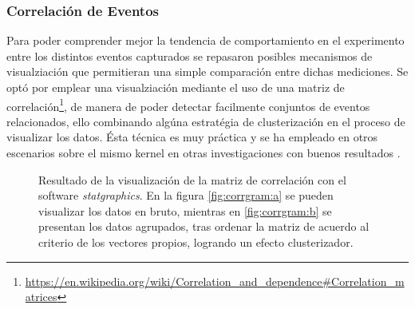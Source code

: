 \subsubsection{Correlación de Eventos}
Para poder comprender mejor la tendencia de comportamiento en el experimento entre los distintos eventos capturados se repasaron posibles mecanismos de visualziación que permitieran una simple comparación entre dichas mediciones. Se optó por emplear una visualziación mediante el uso de una matriz de correlación\footnote{\url{https://en.wikipedia.org/wiki/Correlation_and_dependence#Correlation_matrices}}, de manera de poder detectar facilmente conjuntos de eventos relacionados, ello combinando algúna estratégia de clusterización en el proceso de visualizar los datos. Ésta técnica es muy práctica y se ha empleado en otros escenarios sobre el mismo kernel en otras investigaciones con buenos resultados \cite{paper:clusteringKernel}.

\begin{figure}[h!]
	\centering
	\hspace*{\fill}
	\hfill
	\caption{Resultado de la visualización de la matriz de correlación con el software \emph{statgraphics}. En la figura \ref{fig:corrgram:a} se pueden visualizar los datos en bruto, mientras en \ref{fig:corrgram:b} se presentan los datos agrupados, tras ordenar la matriz de acuerdo al criterio de los vectores propios, logrando un efecto clusterizador.}
	\label{fig:corrmatrix}
	\hspace*{\fill}
\end{figure}

